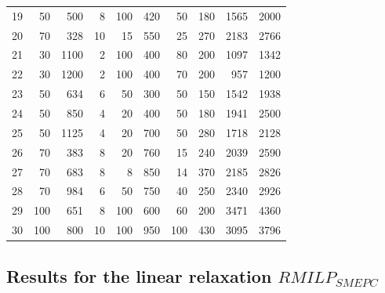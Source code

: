 \documentclass[11pt]{article}
\theoremstyle{plain}%
\theoremstyle{definition} \newtheorem{lem}{Lemma}[section]
\theoremstyle{definition} \newtheorem{claim}{Claim}[lem]
\theoremstyle{definition} \newtheorem{theorem}{Theorem}[section]
\theoremstyle{definition} \newtheorem{exo}{Exercice n$^\circ$}
\theoremstyle{definition} \newtheorem{quest}{}[exo]
\theoremstyle{definition} \newtheorem{sousquest}{}[quest]
\theoremstyle{remark}
\theoremstyle{definition}
\begin{document}
\begin{table}[H]
{\begin{tabular}{|r|rrrrrrrrr|}
    19    & 50    & 500   & 8     & 100   & 420   & 50    & 180   & 1565  & 2000 \\
    20    &70    & 328   & 10    &  15    & 550   & 25    & 270   & 2183  & 2766 \\
    21    & 30    & 1100  & 2     & 100   & 400   & 80    & 200   & 1097  & 1342 \\
     22    &30    & 1200  & 2     & 100   & 400   & 70    & 200   & 957   & 1200 \\
   23    & 50    & 634   & 6     &  50    & 300   & 50    & 150   & 1542  & 1938 \\
    24    & 50    & 850   & 4     & 20    & 400   & 50    & 180   & 1941  & 2500 \\
    25    &50    & 1125  & 4     &  20    & 700   & 50    & 280   & 1718  & 2128 \\
    26    & 70    & 383   & 8     &  20    & 760   & 15    & 240   & 2039  & 2590 \\
    27    & 70    & 683   & 8     & 8     & 850   & 14    & 370   & 2185  & 2826 \\
     28    &70    & 984   & 6     & 50    & 750   & 40    & 250   & 2340  & 2926 \\
    29    &100   & 651   & 8     &  100   & 600   & 60    & 200   & 3471  & 4360 \\
    30    &100   & 800   & 10    &  100   & 950   & 100   & 430   & 3095  & 3796 \\
    \bottomrule
    \end{tabular}%
		}
  \label{tab:inst}%
\end{table}%
\subsection{Results for the linear relaxation $RMILP_{SMEPC}$ }
\end{document}
